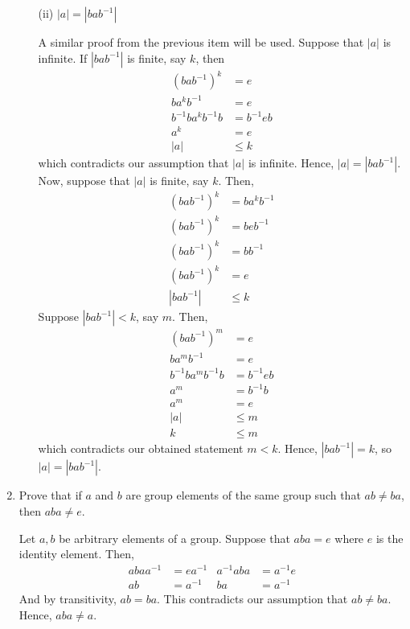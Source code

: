 \begin{enumerate}
\begin{enumerate}
            \item[(ii)] \(|a| = |bab^{-1}|\)

            A similar proof from the previous item will be used. Suppose that \(|a|\) is infinite. If \(|bab^{-1}|\) is finite, say \(k\), then
            \begin{align*}
                (bab^{-1})^k &= e \\
                ba^kb^{-1} &= e \\
                b^{-1}ba^kb^{-1}b &= b^{-1}eb \\
                a^k &= e \\ 
                |a| &\leq k
            \end{align*}
            which contradicts our assumption that \(|a|\) is infinite. Hence, \(|a| = |bab^{-1}|\). Now, suppose that \(|a|\) is finite, say \(k\). Then,
            \begin{align*}
                (bab^{-1})^k &= ba^kb^{-1} \\
                (bab^{-1})^k &= beb^{-1} \\
                (bab^{-1})^k &= bb^{-1} \\
                (bab^{-1})^k &= e \\
                |bab^{-1}| &\leq k
            \end{align*}
            Suppose \(|bab^{-1}| < k\), say \(m\). Then,
            \begin{align*}
                (bab^{-1})^m &= e \\
                ba^mb^{-1} &= e \\
                b^{-1}ba^mb^{-1}b &= b^{-1}eb \\
                a^m &= b^{-1}b \\
                a^m &= e \\
                |a| &\leq m \\
                k &\leq m
            \end{align*}
            which contradicts our obtained statement \(m < k\). Hence, \(|bab^{-1}| = k\), so \(|a| = |bab^{-1}|\).
        \end{enumerate}

        \item Prove that if \(a\) and \(b\) are group elements of the same group such that \(ab \neq ba\), then \(aba \neq e\).

        Let \(a, b\) be arbitrary elements of a group. Suppose that \(aba = e\) where \(e\) is the identity element. Then,
        \begin{align*}
            abaa^{-1} &= ea^{-1} & a^{-1}aba &= a^{-1}e \\
            ab &= a^{-1} & ba &= a^{-1}
        \end{align*}
        And by transitivity, \(ab = ba\). This contradicts our assumption that \(ab \neq ba\). Hence, \(aba \neq a\).


\end{enumerate}
